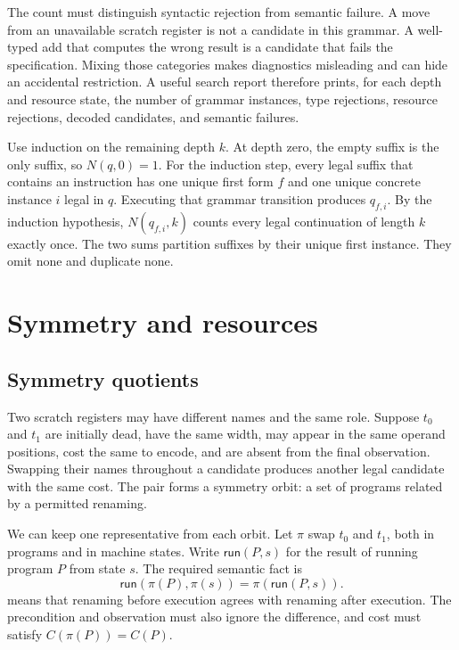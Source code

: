 The count must distinguish syntactic rejection from semantic failure. A move
from an unavailable scratch register is not a candidate in this grammar. A
well-typed add that computes the wrong result is a candidate that fails the
specification. Mixing those categories makes diagnostics misleading and can
hide an accidental restriction. A useful search report therefore prints, for
each depth and resource state, the number of grammar instances, type
rejections, resource rejections, decoded candidates, and semantic failures.

\begin{proofkit}[title={Reader proof: the resource recurrence is complete}]
Use induction on the remaining depth \(k\). At depth zero, the empty suffix is
the only suffix, so \(N(q,0)=1\). For the induction step, every legal suffix
that contains an instruction has one unique first form \(f\) and one unique concrete
instance \(i\) legal in \(q\). Executing that grammar transition produces
\(q_{f,i}\). By the induction hypothesis, \(N(q_{f,i},k)\) counts every legal
continuation of length \(k\) exactly once. The two sums partition suffixes by
their unique first instance. They omit none and duplicate none.
\end{proofkit}

\section{Symmetry and resources}

\subsection{Symmetry quotients}

Two scratch registers may have different names and the same role. Suppose
\(t_0\) and \(t_1\) are initially dead, have the same width, may appear in the
same operand positions, cost the same to encode, and are absent from the final
observation. Swapping their names throughout a candidate produces another
legal candidate with the same cost. The pair forms a symmetry orbit: a set of
programs related by a permitted renaming.

We can keep one representative from each orbit. Let \(\pi\) swap \(t_0\) and
\(t_1\), both in programs and in machine states. Write
\(\mathsf{run}(P,s)\) for the result of running program \(P\) from state
\(s\). The required semantic fact is
\[
  \mathsf{run}(\pi(P),\pi(s))
  =\pi(\mathsf{run}(P,s)).
\]
 means that renaming before execution agrees with
renaming after execution. The precondition and observation must also ignore
the difference, and cost must satisfy \(C(\pi(P))=C(P)\).

